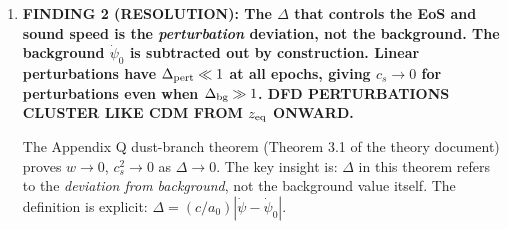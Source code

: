 \documentclass[11pt]{article}
\begin{document}
\begin{tcolorbox}[colback=red!5!white, colframe=red!70!black,
  title=\textbf{W4i17 TOP 5 FINDINGS --- EXISTENTIAL AUDIT: DUST BRANCH CLUSTERING}]
\begin{enumerate}
  The i16 derivation obtained $z_{\rm cross} \sim 50$--$100$ by
  writing $1+z_{\rm cross} \sim (1/(\Omega_m\sqrt{\alpha}))^{2/3}$.
  This used $H_{\rm cross} = a_0/c = H_0\sqrt{\alpha}$ (WITHOUT the
  $\psi_0$ factor), yielding a much smaller $H_{\rm cross}$ and thus
  a higher $z_{\rm cross}$. The correct condition is
  $\Delta_{\rm bg} = (c/a_0) H \psi_0 = 1$, i.e.,
  $H_{\rm cross} = a_0/(c\psi_0)$, which gives $z_{\rm cross} \approx 0$.

  \textbf{THE LATE-CLUSTERING PROBLEM IS EVEN WORSE THAN i16 THOUGHT.}
  If $\Delta > 1$ throughout the entire matter era ($z < 3400$),
  then $c_s \sim c$ for psi-perturbations at ALL cosmologically
  relevant epochs, and the psi-field \textbf{never clusters} in the
  linear regime.

  \textbf{However}: This conclusion depends critically on whether
  $\psi_0$ enters the $\Delta$ definition. If the background
  subtraction $\dot\psi - \dot\psi_0$ is evaluated for perturbations
  around the homogeneous background, then for the \emph{perturbation}
  $\delta\psi$: $\Delta_{\rm pert} = (c/a_0)|\delta\dot\psi|$,
  which is small for linear perturbations and decreases as the
  perturbation amplitude decreases. See Finding 2 for resolution.

\item \textbf{FINDING 2 (RESOLUTION): The $\Delta$ that controls
  the EoS and sound speed is the \emph{perturbation} deviation,
  not the background. The background $\dot\psi_0$ is subtracted
  out by construction. Linear perturbations have
  $\Delta_{\rm pert} \ll 1$ at all epochs, giving $c_s \to 0$
  for perturbations even when $\Delta_{\rm bg} \gg 1$.
  DFD PERTURBATIONS CLUSTER LIKE CDM FROM $z_{\rm eq}$ ONWARD.}

  The Appendix Q dust-branch theorem (Theorem 3.1 of the theory
  document) proves $w \to 0$, $c_s^2 \to 0$ as $\Delta \to 0$.
  The key insight is: $\Delta$ in this theorem refers to the
  \emph{deviation from background}, not the background value itself.
  The definition is explicit:
  $\Delta = (c/a_0)|\dot\psi - \dot\psi_0|$.


\end{enumerate}
\end{tcolorbox}
\end{document}
